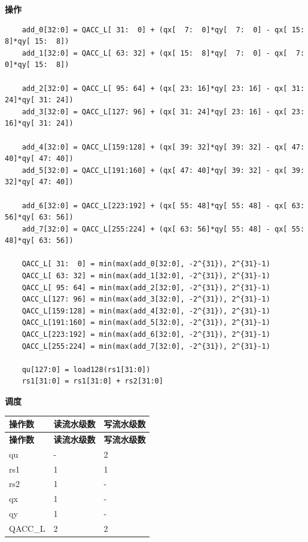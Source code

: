 \textbf{操作}\\
\begin{lstlisting}
    add_0[32:0] = QACC_L[ 31:  0] + (qx[  7:  0]*qy[  7:  0] - qx[ 15:  8]*qy[ 15:  8])
    add_1[32:0] = QACC_L[ 63: 32] + (qx[ 15:  8]*qy[  7:  0] - qx[  7:  0]*qy[ 15:  8])

    add_2[32:0] = QACC_L[ 95: 64] + (qx[ 23: 16]*qy[ 23: 16] - qx[ 31: 24]*qy[ 31: 24])
    add_3[32:0] = QACC_L[127: 96] + (qx[ 31: 24]*qy[ 23: 16] - qx[ 23: 16]*qy[ 31: 24])

    add_4[32:0] = QACC_L[159:128] + (qx[ 39: 32]*qy[ 39: 32] - qx[ 47: 40]*qy[ 47: 40])
    add_5[32:0] = QACC_L[191:160] + (qx[ 47: 40]*qy[ 39: 32] - qx[ 39: 32]*qy[ 47: 40])

    add_6[32:0] = QACC_L[223:192] + (qx[ 55: 48]*qy[ 55: 48] - qx[ 63: 56]*qy[ 63: 56])
    add_7[32:0] = QACC_L[255:224] + (qx[ 63: 56]*qy[ 55: 48] - qx[ 55: 48]*qy[ 63: 56])

    QACC_L[ 31:  0] = min(max(add_0[32:0], -2^{31}), 2^{31}-1)
    QACC_L[ 63: 32] = min(max(add_1[32:0], -2^{31}), 2^{31}-1)
    QACC_L[ 95: 64] = min(max(add_2[32:0], -2^{31}), 2^{31}-1)
    QACC_L[127: 96] = min(max(add_3[32:0], -2^{31}), 2^{31}-1)
    QACC_L[159:128] = min(max(add_4[32:0], -2^{31}), 2^{31}-1)
    QACC_L[191:160] = min(max(add_5[32:0], -2^{31}), 2^{31}-1)
    QACC_L[223:192] = min(max(add_6[32:0], -2^{31}), 2^{31}-1)
    QACC_L[255:224] = min(max(add_7[32:0], -2^{31}), 2^{31}-1)

    qu[127:0] = load128(rs1[31:0])
    rs1[31:0] = rs1[31:0] + rs2[31:0]
\end{lstlisting}

\textbf{调度}\\
\begin{longtable}[c]{|l|l|l|}
    \hline
    \rowcolor{lightgray}
    \textbf{操作数} & \textbf{读流水级数} & \textbf{写流水级数} \\\hline
    \endfirsthead
    \hline
    \rowcolor{lightgray}
     \textbf{操作数} & \textbf{读流水级数} & \textbf{写流水级数} \\\hline
    \endhead
    \hline
    \endfoot

    qu & - & 2 \\\hline
    rs1 & 1 & 1 \\\hline
    rs2 & 1 & - \\\hline
     qx & 1 & - \\\hline
     qy & 1 & - \\\hline
     QACC\_L & 2 & 2

\end{longtable}

